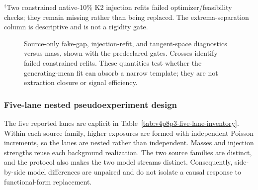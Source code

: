 \begin{table}[htbp]
\centering
\caption{Signal-influence diagnostics.  The quantity
$z\lvert f_{\mathrm{abs}}\rvert$ is an absorbed shift in units of the declared
diagonal-Poisson $\sigma_A$, not a percentage.}
\label{tab:v4p8p3-signal-influence}
\vspace{0.25em}

{\footnotesize $^\dagger$Two constrained native-10\% K2 injection refits
failed optimizer/feasibility checks; they remain missing rather than being
replaced.  The extrema-separation column is descriptive and is not a rigidity
gate.}
\end{table}

\begin{figure}[htbp]
\centering
{}
\caption{Source-only fake-gap, injection-refit, and tangent-space diagnostics
versus mass, shown with the predeclared gates.  Crosses identify failed
constrained refits.  These quantities test whether the generating-mean fit can
absorb a narrow template; they are not extraction closure or signal
efficiency.}
\label{fig:v4p8p3-signal-influence}
\end{figure}

\subsubsection{Five-lane nested pseudoexperiment design}

The five reported lanes are explicit in Table~\ref{tab:v4p8p3-five-lane-inventory}.
Within each source family, higher exposures are formed with independent Poisson
increments, so the lanes are nested rather than independent.  Masses and
injection strengths reuse each background realization.  The two source
families are distinct, and the protocol also makes the two model streams
distinct.  Consequently, side-by-side model differences are unpaired and do
not isolate a causal response to functional-form replacement.

